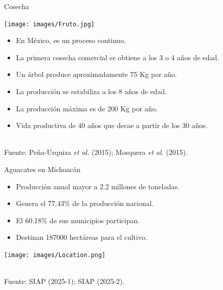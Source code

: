 \documentclass[aspectratio=169]{beamer}
\begin{document}
\begin{frame}{Cosecha}
    \vspace{-1cm}
    \begin{minipage}{0.5\textwidth}
			\hspace{-0.5cm}
            \centering
            \texttt{[image: images/Fruto.jpg]}
		\end{minipage}%
		\begin{minipage}{0.5\textwidth}
            \begin{block}{}
                \begin{itemize}
                    \item En México, es un proceso continuo.
				\item La primera cosecha comercial se obtiene a los 3 o 4 años de edad.
                    \item Un árbol produce aproximadamente 75 Kg por año.  
                    \item La producción se estabiliza a los 8 años de edad.
                    \item La producción máxima es de 200 Kg por año.
                    \item Vida productiva de 40 años que decae a partir de los 30 años.
			\end{itemize}
            \end{block}
		\end{minipage}
        \,\\
        \hfill {\scriptsize Fuente: Peña-Urquiza \textit{et al.} (2015); Mosquera \textit{et al.} (2015).}
\end{frame}


\begin{frame}{Aguacates en Michoacán}
    \vspace{-1cm}
		\begin{minipage}{0.5\textwidth}
            \begin{block}{}
                \begin{itemize}
				\item Producción anual mayor a 2.2 millones de toneladas.
                    \item Genera el 77.43\% de la producción nacional.
                    \item El 60.18\% de sus municipios participan.
                    \item Destinan 187000 hectáreas para el cultivo.
			\end{itemize}
            \end{block}
		\end{minipage}%
        \begin{minipage}{0.5\textwidth}
\hspace{-0.5cm}\texttt{[image: images/Location.png]}
		\end{minipage}%
        \,\\
        \hfill {\scriptsize Fuente: SIAP (2025-1); SIAP (2025-2).}
\end{frame}
\end{document}
